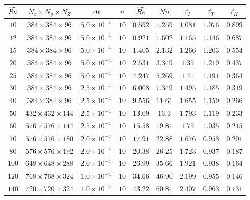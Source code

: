 \setlength{\tabcolsep}{2mm}
\renewcommand{\arraystretch}{0.5}
\begin{table}
	\begin{center}
	\begin{tabular}{c c c c c c c c c}
		\hline
		\hline
		$\widetilde{Ra}$& $N_x\times N_y\times N_Z$ & $\Delta t$ & $n$ & $\widetilde{Re}$ &  $Nu$ &$\ell_{I}$ & $\ell_{T}$ &$\ell_{K}$ \\
\hline	
		\hline
		$10$ & $384\times384\times96$ & $5.0\times 10^{-4}$ & $10$ & $0.592$ & $1.259$ & $1.081$ & $1.076$&$0.899$\\
$12$ & $384\times384\times96$ & $5.0\times 10^{-4}$ & $10$ & $0.921$ & $1.602$ & $1.165$ & $1.146$&$0.687$\\
$15$ & $384\times384\times96$ & $5.0\times 10^{-4}$ & $10$ & $1.405$ & $2.132$ & $1.266$ & $1.203$&$0.554$\\
$20$ & $384\times384\times96$ & $5.0\times 10^{-4}$ & $10$ & $2.531$ & $3.349$ & $1.35$ & $1.219$&$0.437$\\
$25$ & $384\times384\times96$ & $5.0\times 10^{-4}$ & $10$ & $4.247$ & $5.269$ & $1.41$ & $1.191$&$0.364$\\
$30$ & $384\times384\times96$ & $2.5\times 10^{-4}$ & $10$ & $6.008$ & $7.349$ & $1.495$ & $1.185$&$0.319$\\
$40$ & $384\times384\times96$ & $2.5\times 10^{-4}$ & $10$ & $9.556$ & $11.61$ & $1.655$ & $1.159$&$0.266$\\
$50$ & $432\times432\times144$ & $2.5\times 10^{-4}$ & $10$ & $13.09$ & $16.3$ & $1.793$ & $1.119$&$0.233$\\
$60$ & $576\times576\times144$ & $2.5\times 10^{-4}$ & $10$ & $15.58$ & $19.81$ & $1.75$ & $1.035$&$0.215$\\
$70$ & $576\times576\times180$ & $2.0\times 10^{-4}$ & $10$ & $17.91$ & $22.88$ & $1.676$ & $0.958$&$0.201$\\
$80$ & $576\times576\times192$ & $2.0\times 10^{-4}$ & $10$ & $20.38$ & $26.25$ & $1.723$ & $0.937$&$0.187$\\
$100$ & $648\times648\times288$ & $2.0\times 10^{-4}$ & $10$ & $26.99$ & $35.66$ & $1.921$ & $0.938$&$0.164$\\
$120$ & $768\times768\times324$ & $1.0\times 10^{-4}$ & $10$ & $34.66$ & $46.90$ & $2.199$ & $0.955$&$0.146$\\
$140$ & $720\times720\times324$ & $1.0\times 10^{-4}$ & $10$ & $43.22$ & $60.81$ & $2.407$ & $0.963$&$0.131$\\

\end{tabular}
\end{center}
\end{table}

